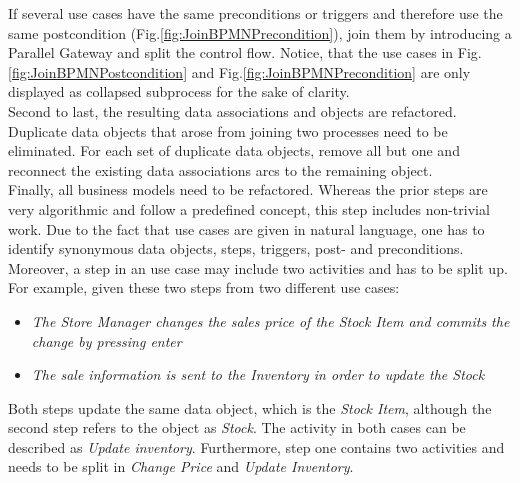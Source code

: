 \noindent
If several use cases have the same preconditions or triggers and therefore use the same postcondition (Fig.\ref{fig:JoinBPMNPrecondition}), join them by introducing a Parallel Gateway and split the control flow. Notice, that the use cases in Fig.\ref{fig:JoinBPMNPostcondition} and Fig.\ref{fig:JoinBPMNPrecondition} are only displayed as collapsed subprocess for the sake of clarity. \\
Second to last, the resulting data associations and objects are refactored. Duplicate data objects that arose from joining two processes need to be eliminated. For each set of duplicate data objects, remove all but one and reconnect the existing data associations arcs to the remaining object. \\ 
Finally, all business models need to be refactored. Whereas the prior steps are very algorithmic and follow a predefined concept, this step includes non-trivial work. Due to the fact that use cases are given in natural language, one has to identify synonymous data objects, steps, triggers, post- and preconditions. Moreover, a step in an use case may include two activities and has to be split up. For example, given these two steps from two different use cases:
\begin{itemize}
	\item \textit{The Store Manager changes the sales price of the Stock Item and commits the change by pressing enter}
	\item \textit{The sale information is sent to the Inventory in order to update the Stock}
\end{itemize}
Both steps update the same data object, which is the \textit{Stock Item}, although the second step refers to the object as \textit{Stock}. The activity in both cases can be described as \textit{Update inventory}. Furthermore, step one contains two activities and needs to be split in \textit{Change Price} and \textit{Update Inventory}.



